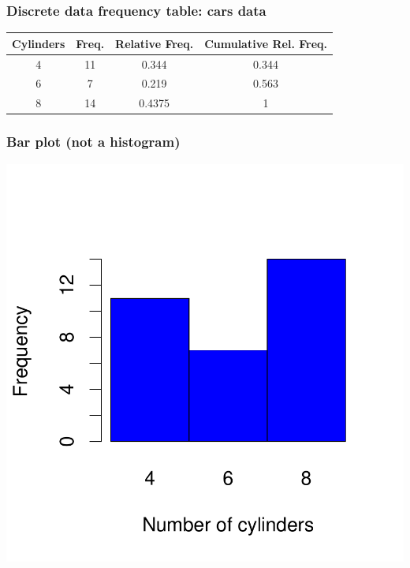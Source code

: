 \documentclass[handout]{beamer}
\numberwithin{equation}{section}
\begin{document}
\begin{frame}
\frametitle{Discrete data frequency table: cars data}

\begin{tabular}{|c|c|c|c|}
\hline
Cylinders & Freq. & Relative Freq. & Cumulative Rel. Freq.\\ \hline
4 & 11 & 0.344 & 0.344 \\ \hline
6 & 7 & 0.219 & 0.563 \\ \hline
8 & 14 & 0.4375 & 1\\ \hline
\end{tabular}
\end{frame}


\begin{frame}[fragile]
\frametitle{Bar plot (not a histogram)}
\includegraphics{ch3part1-003}
\end{frame}
\end{document}
